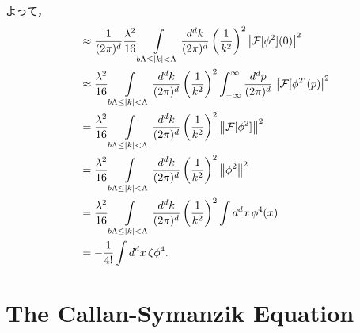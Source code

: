 よって，
\begin{align*}
  &\approx \frac{1}{(2\pi)^d} \frac{\lambda^2}{16}
  \int\displaylimits_{b\Lambda \leq \lvert k \rvert < \Lambda} \frac{d^dk}{(2\pi)^d} \left( \frac{1}{k^2} \right)^2
  \left\lvert \mathcal{F}[\phi^2](0) \right\rvert^2 \\
  &\approx \frac{\lambda^2}{16}
  \int\displaylimits_{b\Lambda \leq \lvert k \rvert < \Lambda} \frac{d^dk}{(2\pi)^d} \left( \frac{1}{k^2} \right)^2
  \int_{-\infty}^\infty \frac{d^dp}{(2\pi)^d} \, \left\lvert \mathcal{F}[\phi^2](p) \right\rvert^2 \\
  &= \frac{\lambda^2}{16}
  \int\displaylimits_{b\Lambda \leq \lvert k \rvert < \Lambda} \frac{d^dk}{(2\pi)^d} \left( \frac{1}{k^2} \right)^2
  \left\lVert \mathcal{F}[\phi^2] \right\rVert^2 \\
  &= \frac{\lambda^2}{16}
  \int\displaylimits_{b\Lambda \leq \lvert k \rvert < \Lambda} \frac{d^dk}{(2\pi)^d} \left( \frac{1}{k^2} \right)^2
  \left\lVert \phi^2 \right\rVert^2 \\
  &= \frac{\lambda^2}{16}
  \int\displaylimits_{b\Lambda \leq \lvert k \rvert < \Lambda} \frac{d^dk}{(2\pi)^d} \left( \frac{1}{k^2} \right)^2
  \int d^dx \, \phi^4(x) \\
  &= - \frac{1}{4!} \int d^dx \, \zeta \phi^4 .
\end{align*}

\section{The Callan-Symanzik Equation}
